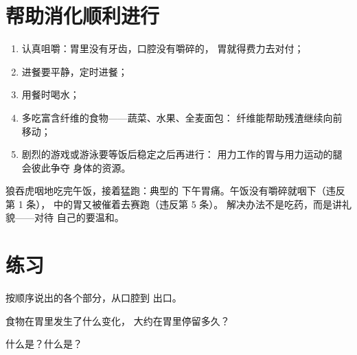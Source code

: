 \section{帮助消化顺利进行}

\begin{method}[有助消化的习惯]\label{met:g4:journey-of-food:habits}
\begin{enumerate}
  \item 认真咀嚼：胃里没有牙齿，口腔没有嚼碎的，
        胃就得费力去对付；
  \item 进餐要平静，定时进餐；
  \item 用餐时喝水；
  \item 多吃富含纤维的食物——蔬菜、水果、全麦面包：
        纤维能帮助残渣继续向前移动；
  \item 剧烈的游戏或游泳要等饭后稳定之后再进行：
        用力工作的胃与用力运动的腿会彼此争夺
        身体的资源。
\end{enumerate}
\end{method}

\begin{example}[胃痛侦探]\label{ex:g4:journey-of-food:ache}
狼吞虎咽地吃完午饭，接着猛跑：典型的
下午胃痛。午饭没有嚼碎就咽下（违反第 1 条），
中的胃又被催着去赛跑（违反第 5 条）。
解决办法不是吃药，而是讲礼貌——对待
自己的要温和。
\end{example}

\section{练习}

\begin{exercise}[$\star$]\label{exo:g4:journey-of-food:1}
按顺序说出的各个部分，从口腔到
出口。
\end{exercise}

\begin{exercise}[$\star$]\label{exo:g4:journey-of-food:2}
食物在胃里发生了什么变化，
大约在胃里停留多久？
\end{exercise}

\begin{exercise}[$\star$]\label{exo:g4:journey-of-food:3}
什么是？什么是？
\end{exercise}

